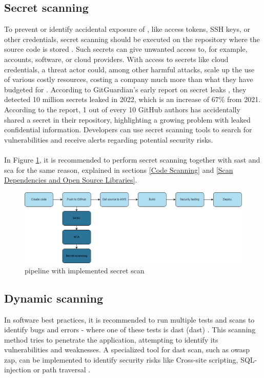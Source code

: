 \subsection{Secret scanning}
To prevent or identify accidental exposure of , like access tokens, SSH keys, or other credentials, secret scanning should be executed on the repository where the source code is stored \cite{GithubSecretScanning}. Such secrets can give unwanted access to, for example, accounts, software, or cloud providers. With access to secrets like cloud credentials, a threat actor could, among other harmful attacks, scale up the use of various costly resources, costing a company much more than what they have budgeted for \cite{GitGuardianexploitexample}. According to GitGuardian's early report on secret leaks \cite{GitGuardiansecretsprawl}, they detected 10 million secrets leaked in 2022, which is an increase of 67\% from 2021. According to the report, 1 out of every 10 GitHub authors has accidentally shared a secret in their repository, highlighting a growing problem with leaked confidential information. Developers can use secret scanning tools to search for vulnerabilities and receive alerts regarding potential security risks. 
\\~\\
In Figure \ref{fig: Pipeline with implemented secret scan}, it is recommended to perform secret scanning together with \acrshort{sast} and \acrshort{sca} for the same reason, explained in sections \ref{Code Scanning} and \ref{Scan Dependencies and Open Source Libraries}.

\vspace{2mm}
\begin{figure}[H]
    \centering
    \includegraphics[width=0.8\columnwidth]{Images/pipeline4.png}
    \caption{\gls{pipeline} with implemented secret scan}
    \label{fig: Pipeline with implemented secret scan}
\end{figure}

\subsection{Dynamic scanning}
In software best practices, it is recommended to run multiple tests and scans to identify bugs and errors - where one of these tests is \acrlong{dast} (\acrshort{dast}) \cite{bestpracticeSupplyChain}. This scanning method tries to penetrate the application, attempting to identify its vulnerabilities and weaknesses. A specialized tool for \acrshort{dast} scan, such as \acrshort{owasp} \acrshort{zap}, can be implemented to identify security risks like
\gls{Cross-site scripting}, \gls{SQL-injection} or path traversal \cite{dynamictesting}.


